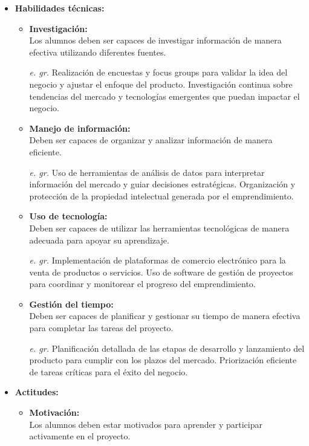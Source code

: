 \begin{itemize}
\begin{itemize}
    \end{itemize}
    \item \textbf{Habilidades técnicas:}
    \begin{itemize}
        \item \textbf{Investigación:}\\
        Los alumnos deben ser capaces de investigar información de manera efectiva utilizando diferentes fuentes.
        \item[\textit{e. gr.}]Realización de encuestas y focus groups para validar la idea del negocio y ajustar el enfoque del producto. Investigación continua sobre tendencias del mercado y tecnologías emergentes que puedan impactar el negocio.
        \item \textbf{Manejo de información:}\\
         Deben ser capaces de organizar y analizar información de manera eficiente.
         \item[\textit{e. gr.}]Uso de herramientas de análisis de datos para interpretar información del mercado y guiar decisiones estratégicas. Organización y protección de la propiedad intelectual generada por el emprendimiento.
         \item \textbf{Uso de tecnología:}\\
         Deben ser capaces de utilizar las herramientas tecnológicas de manera adecuada para apoyar su aprendizaje.
         \item[\textit{e. gr.}] Implementación de plataformas de comercio electrónico para la venta de productos o servicios. Uso de software de gestión de proyectos para coordinar y monitorear el progreso del emprendimiento.
         \item \textbf{Gestión del tiempo:}\\
         Deben ser capaces de planificar y gestionar su tiempo de manera efectiva para completar las tareas del proyecto.
         \item[\textit{e. gr.}]Planificación detallada de las etapas de desarrollo y lanzamiento del producto para cumplir con los plazos del mercado. Priorización eficiente de tareas críticas para el éxito del negocio.
    \end{itemize}
    \item \textbf{Actitudes:}
    \begin{itemize}
        \item \textbf{Motivación:}\\
        Los alumnos deben estar motivados para aprender y participar activamente en el proyecto.

\end{itemize}
\end{itemize}
